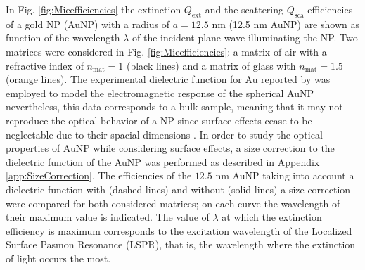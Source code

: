 




In Fig. \ref{fig:Mieefficiencies} the extinction  $Q_\text{ext}$ and the scattering  $Q_\text{sca}$ efficiencies of a gold NP (AuNP) with a radius of $a = 12.5$ nm (12.5 nm AuNP) are shown as function of the wavelength $\lambda$ of the incident plane wave illuminating the NP. Two matrices were considered in Fig. \ref{fig:Mieefficiencies}: a matrix of air with a refractive index of $n_\text{mat} = 1$ (black lines) and a matrix of glass with $n_\text{mat} = 1.5$ (orange lines).  The experimental dielectric function for Au reported by \citeauthor{johnson_optical_1972} \cite{johnson_optical_1972}  was employed to model the electromagnetic response of the spherical AuNP nevertheless, this data corresponds to a bulk sample, meaning that it may not reproduce the optical behavior of a NP since surface effects cease to be neglectable  due to their spacial dimensions \cite{noguez_surface_2007}.   In order to study  the optical properties of AuNP while considering  surface effects,  a size correction to the dielectric function of the AuNP was performed as described in Appendix \ref{app:SizeCorrection}. The efficiencies of the $12.5$ nm AuNP  taking into account a dielectric function with (dashed lines) and without (solid lines) a size correction were compared for both considered matrices; on each curve the wavelength of their maximum value is indicated. The value of $\lambda$ at which the extinction efficiency is maximum corresponds to the excitation wavelength of the Localized Surface Pasmon Resonance (LSPR), that is, the wavelength where the extinction of light occurs the most.

